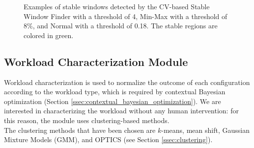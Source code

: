 \documentclass[a4paper, 12pt]{article} %
\begin{document}
	\begin{figure}\centering
		\hfill 
		\hfill
		
		\caption{Examples of stable windows detected by the CV-based Stable Window Finder with a threshold of 4, Min-Max with a threshold of 8\%, and Normal with a threshold of 0.18. The stable regions are colored in green.}
		\label{fig:threshold_selection}
	\end{figure}
	
	
	
	\subsection{Workload Characterization Module}  \label{ssec:workload_characterization_module}
	Workload characterization is used to normalize the outcome of each configuration according to the workload type, which is required by contextual Bayesian optimization (Section \ref{ssec:contextual_bayesian_optimization}). We are interested in characterizing the workload without any human intervention: for this reason, the module uses clustering-based methods. \\
	The clustering methods that have been chosen are $k$-means, mean shift, Gaussian Mixture Models (GMM), and OPTICS (see Section \ref{ssec:clustering}).
	
\end{document}
